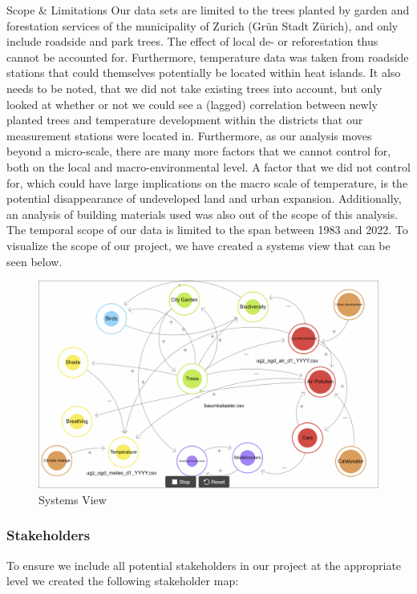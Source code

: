 \documentclass[
]{article}
\begin{document}
Scope \& Limitations Our data sets are limited to the trees planted by
garden and forestation services of the municipality of Zurich (Grün
Stadt Zürich), and only include roadside and park trees. The effect of
local de- or reforestation thus cannot be accounted for. Furthermore,
temperature data was taken from roadside stations that could themselves
potentially be located within heat islands. It also needs to be noted,
that we did not take existing trees into account, but only looked at
whether or not we could see a (lagged) correlation between newly planted
trees and temperature development within the districts that our
measurement stations were located in. Furthermore, as our analysis moves
beyond a micro-scale, there are many more factors that we cannot control
for, both on the local and macro-environmental level. A factor that we
did not control for, which could have large implications on the macro
scale of temperature, is the potential disappearance of undeveloped land
and urban expansion. Additionally, an analysis of building materials
used was also out of the scope of this analysis. The temporal scope of
our data is limited to the span between 1983 and 2022. To visualize the
scope of our project, we have created a systems view that can be seen
below.

\begin{figure}
\centering
\includegraphics{../images/loopy.gif}
\caption{Systems View}
\end{figure}

\hypertarget{stakeholders}{%
\subsubsection{Stakeholders}\label{stakeholders}}

To ensure we include all potential stakeholders in our project at the
appropriate level we created the following stakeholder map:
\end{document}

